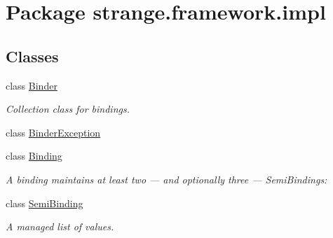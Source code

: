 \hypertarget{namespacestrange_1_1framework_1_1impl}{\section{Package strange.\-framework.\-impl}
\label{namespacestrange_1_1framework_1_1impl}
}
\subsection*{Classes}
\begin{DoxyCompactItemize}
\item 
class \hyperlink{classstrange_1_1framework_1_1impl_1_1_binder}{Binder}
\begin{DoxyCompactList}\small\item\em Collection class for bindings. \end{DoxyCompactList}\item 
class \hyperlink{classstrange_1_1framework_1_1impl_1_1_binder_exception}{Binder\-Exception}
\item 
class \hyperlink{classstrange_1_1framework_1_1impl_1_1_binding}{Binding}
\begin{DoxyCompactList}\small\item\em A binding maintains at least two — and optionally three — Semi\-Bindings\-: \end{DoxyCompactList}\item 
class \hyperlink{classstrange_1_1framework_1_1impl_1_1_semi_binding}{Semi\-Binding}
\begin{DoxyCompactList}\small\item\em A managed list of values. \end{DoxyCompactList}\end{DoxyCompactItemize}
